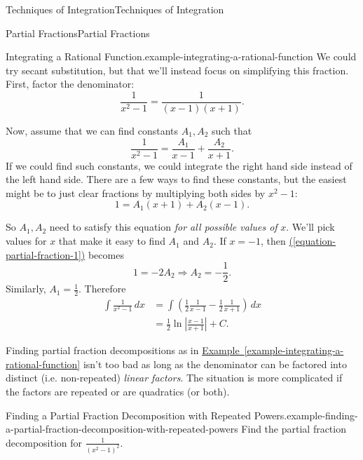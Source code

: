 \documentclass[10pt,]{book}
\numberwithin{equation}{section}
\begin{document}
\begin{chapterptx}{Techniques of Integration}{}{Techniques of Integration}{}{}
\begin{sectionptx}{Partial Fractions}{}{Partial Fractions}{}{}
\begin{example}{Integrating a Rational Function.}{example-integrating-a-rational-function}
\hypertarget{p-551}{}%
We could try secant substitution, but that we'll instead focus on simplifying this fraction. First, factor the denominator:%
\begin{equation*}
\frac{1}{x^{2} - 1} = \frac{1}{(x-1)(x+1)}.
\end{equation*}
%
\par
\hypertarget{p-552}{}%
Now, assume that we can find constants \(A_{1}, A_{2}\) such that%
\begin{equation*}
\frac{1}{x^{2} - 1} = \frac{A_{1}}{x-1} + \frac{A_{2}}{x + 1}.
\end{equation*}
If we could find such constants, we could integrate the right hand side instead of the left hand side. There are a few ways to find these constants, but the easiest might be to just clear fractions by multiplying both sides by \(x^{2} - 1\):%
\begin{equation}
1 = A_{1}(x + 1) + A_{2}(x - 1).\label{equation-partial-fraction-1}
\end{equation}
%
\par
\hypertarget{p-553}{}%
So \(A_{1},A_{2}\) need to satisfy this equation \emph{for all possible values of} \(x\). We'll pick values for \(x\) that make it easy to find \(A_{1}\) and \(A_{2}\). If \(x = -1\), then \hyperref[equation-partial-fraction-1]{(\ref{equation-partial-fraction-1})} becomes%
\begin{equation*}
1 = -2A_{2} \Rightarrow A_{2} = -\frac{1}{2}.
\end{equation*}
Similarly, \(A_{1} = \frac{1}{2}.\) Therefore%
%
\begin{align*}
\int\frac{1}{x^{2}-1}\,dx & = \int\left(\frac{1}{2}\frac{1}{x-1} - \frac{1}{2}\frac{1}{x+1}\right)\,dx \\
& = \frac{1}{2}\ln\left|\frac{x-1}{x+1}\right| + C. 
\end{align*}
\end{example}
\hypertarget{p-554}{}%
Finding partial fraction decompositions as in \hyperref[example-integrating-a-rational-function]{Example~\ref{example-integrating-a-rational-function}} isn't too bad as long as the denominator can be factored into distinct (i.e. non-repeated) \emph{linear factors}. The situation is more complicated if the factors are repeated or are quadratics (or both).%
\begin{example}{Finding a Partial Fraction Decomposition with Repeated Powers.}{example-finding-a-partial-fraction-decomposition-with-repeated-powers}%
\hypertarget{p-555}{}%
Find the partial fraction decomposition for \(\frac{1}{(x^{2} - 1)^{2}}\).%

\end{example}
\end{sectionptx}
\end{chapterptx}
\end{document}
